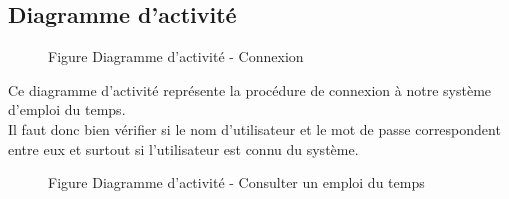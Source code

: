 \documentclass[a4paper, 11pt]{article}
\begin{document}
        \subsection{Diagramme d'activité}
        \begin{figure}[h]
        \caption{Figure Diagramme d'activité - Connexion}
        \label{fig-diag-activite-connexion}
        \end{figure}
        Ce diagramme d'activité représente la procédure de connexion à notre système d'emploi du temps.\\
        Il faut donc bien vérifier si le nom d'utilisateur et le mot de passe correspondent entre eux et surtout si l'utilisateur est connu du système.
        \clearpage
        \begin{figure}[h]
        \caption{Figure Diagramme d'activité - Consulter un emploi du temps}
        \label{fig-diag-activite-consulter}
        \end{figure}
\end{document}
